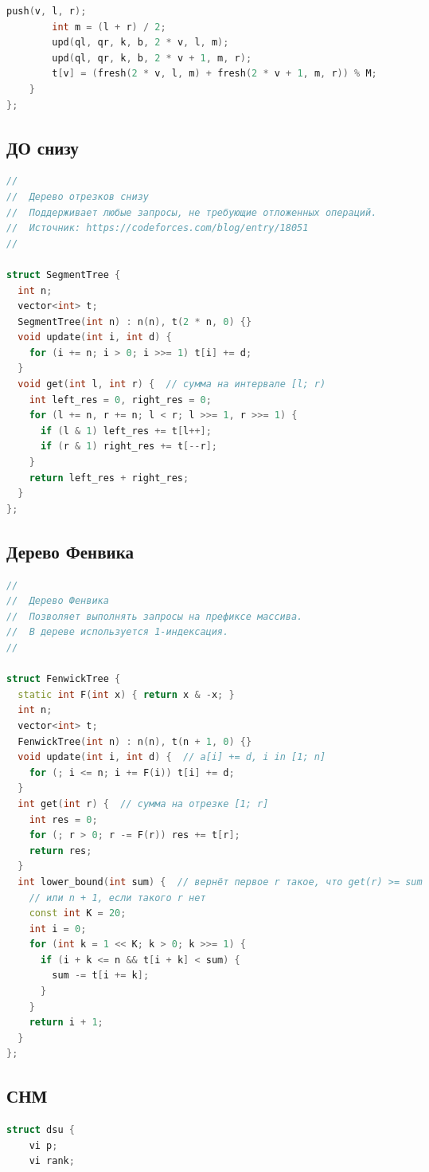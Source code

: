 \documentclass[10pt,a4paper,landscape,twosided]{extarticle}
\begin{document}
\begin{multicols}{3}
\begin{lstlisting}[language=C++]
        push(v, l, r);
        int m = (l + r) / 2;
        upd(ql, qr, k, b, 2 * v, l, m);
        upd(ql, qr, k, b, 2 * v + 1, m, r);
        t[v] = (fresh(2 * v, l, m) + fresh(2 * v + 1, m, r)) % M;
    }
};
\end{lstlisting}

\subsection{ДО снизу}
\begin{lstlisting}[language=C++]
//
//  Дерево отрезков снизу
//  Поддерживает любые запросы, не требующие отложенных операций.
//  Источник: https://codeforces.com/blog/entry/18051
//

struct SegmentTree {
  int n;
  vector<int> t;
  SegmentTree(int n) : n(n), t(2 * n, 0) {}
  void update(int i, int d) {
    for (i += n; i > 0; i >>= 1) t[i] += d;
  }
  void get(int l, int r) {  // сумма на интервале [l; r)
    int left_res = 0, right_res = 0;
    for (l += n, r += n; l < r; l >>= 1, r >>= 1) {
      if (l & 1) left_res += t[l++];
      if (r & 1) right_res += t[--r];
    }
    return left_res + right_res;
  }
};
\end{lstlisting}

\subsection{Дерево Фенвика}
\begin{lstlisting}[language=C++]
//
//  Дерево Фенвика
//  Позволяет выполнять запросы на префиксе массива.
//  В дереве используется 1-индексация.
//

struct FenwickTree {
  static int F(int x) { return x & -x; }
  int n;
  vector<int> t;
  FenwickTree(int n) : n(n), t(n + 1, 0) {}
  void update(int i, int d) {  // a[i] += d, i in [1; n]
    for (; i <= n; i += F(i)) t[i] += d;
  }
  int get(int r) {  // сумма на отрезке [1; r]
    int res = 0;
    for (; r > 0; r -= F(r)) res += t[r];
    return res;
  }
  int lower_bound(int sum) {  // вернёт первое r такое, что get(r) >= sum
    // или n + 1, если такого r нет
    const int K = 20;
    int i = 0;
    for (int k = 1 << K; k > 0; k >>= 1) {
      if (i + k <= n && t[i + k] < sum) {
        sum -= t[i += k];
      }
    }
    return i + 1;
  }
};
\end{lstlisting}

\subsection{СНМ}
\begin{lstlisting}[language=C++]
struct dsu {
    vi p;
    vi rank;


\end{lstlisting}
\end{multicols}
\end{document}
